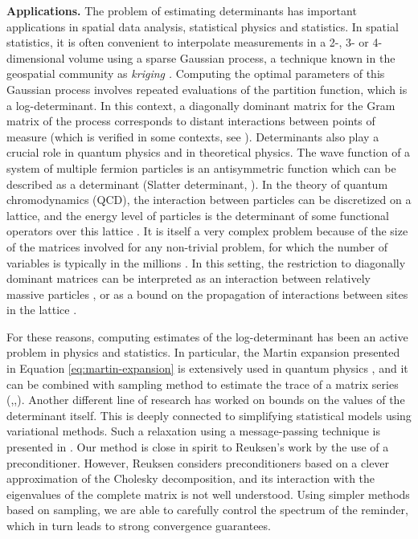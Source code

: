 \textbf{Applications.} The problem of estimating determinants has
important applications in spatial data analysis, statistical physics
and statistics. In spatial statistics, it is often convenient to interpolate
measurements in a 2-, 3- or 4-dimensional volume using a sparse Gaussian
process, a technique known in the geospatial community as \emph{kriging
}\cite{zhang2010kriging,li2005analysis}\emph{. }Computing the optimal
parameters of this Gaussian process involves repeated evaluations
of the partition function, which is a log-determinant. In this context,
a diagonally dominant matrix for the Gram matrix of the process corresponds
to distant interactions between points of measure (which is verified
in some contexts, see \cite{KelleyPace1997291}). Determinants also
play a crucial role in quantum physics and in theoretical physics.
The wave function of a system of multiple fermion particles is an
antisymmetric function which can be described as a determinant (Slatter
determinant, \cite{atkins2011molecular,lowdin1955quantum}). In the
theory of quantum chromodynamics (QCD), the interaction between particles
can be discretized on a lattice, and the energy level of particles
is the determinant of some functional operators over this lattice
\cite{duncan1998efficient}. It is itself a very complex problem because
of the size of the matrices involved for any non-trivial problem,
for which the number of variables is typically in the millions \cite{bernardson1994monte}.
In this setting, the restriction to diagonally dominant matrices can
be interpreted as an interaction between relatively massive particles
\cite{deForcrand1989516}, or as a bound on the propagation of interactions
between sites in the lattice \cite{bernardson1994monte}.

For these reasons, computing estimates of the log-determinant has
been an active problem in physics and statistics. In particular, the
Martin expansion presented in Equation \ref{eq:martin-expansion}
is extensively used in quantum physics \cite{Ipsen2006}, and it can
be combined with sampling method to estimate the trace of a matrix
series (\cite{Zhang2008},\cite{McCourt2008},\cite{Zhang2007}).
Another different line of research has worked on bounds on the values
of the determinant itself. This is deeply connected to simplifying
statistical models using variational methods. Such a relaxation using
a message-passing technique is presented in \cite{Wainwright2006}.
Our method is close in spirit to Reuksen's work \cite{Reusken2002}
by the use of a preconditioner. However, Reuksen considers preconditioners
based on a clever approximation of the Cholesky decomposition, and
its interaction with the eigenvalues of the complete matrix is not
well understood. Using simpler methods based on sampling, we are able
to carefully control the spectrum of the reminder, which in turn leads
to strong convergence guarantees.

